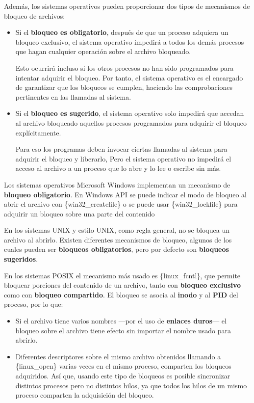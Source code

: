 Además, los sistemas operativos pueden proporcionar dos tipos de
mecanismos de bloqueo de archivos:

\begin{itemize}
\item
  Si el \textbf{bloqueo es obligatorio}{}, después de que un proceso
  adquiera un bloqueo exclusivo, el sistema operativo impedirá a todos
  los demás procesos que hagan cualquier operación sobre el archivo
  bloqueado.

  Esto ocurrirá incluso si los otros procesos no han sido programados
  para intentar adquirir el bloqueo. Por tanto, el sistema operativo es
  el encargado de garantizar que los bloqueos se cumplen, haciendo las
  comprobaciones pertinentes en las llamadas al sistema.
\item
  Si el \textbf{bloqueo es sugerido}{}, el sistema operativo solo
  impedirá que accedan al archivo bloqueado aquellos procesos
  programados para adquirir el bloqueo explícitamente.

  Para eso los programas deben invocar ciertas llamadas al sistema para
  adquirir el bloqueo y liberarlo, Pero el sistema operativo no impedirá
  el acceso al archivo a un proceso que lo abre y lo lee o escribe sin
  más.
\end{itemize}

Los sistemas operativos Microsoft Windows implementan un mecanismo de
\textbf{bloqueo obligatorio}. En Windows API se puede indicar el modo de
bloqueo al abrir el archivo con \{win32\_createfile\} o se puede usar
\{win32\_lockfile\} para adquirir un bloqueo sobre una parte del
contenido

En los sistemas UNIX y estilo UNIX, como regla general, no se bloquea un
archivo al abrirlo. Existen diferentes mecanismos de bloqueo, algunos de
los cuales pueden ser \textbf{bloqueos obligatorios}, pero por defecto
son \textbf{bloqueos sugeridos}.

En los sistemas POSIX el mecanismo más usado es \{linux\_fcntl\}, que
permite bloquear porciones del contenido de un archivo, tanto con
\textbf{bloqueo exclusivo} como con \textbf{bloqueo compartido}. El
bloqueo se asocia al \textbf{inodo} y al \textbf{PID} del proceso, por
lo que:

\begin{itemize}
\item
  Si el archivo tiene varios nombres ---por el uso de \textbf{enlaces
  duros}--- el bloqueo sobre el archivo tiene efecto sin importar el
  nombre usado para abrirlo.
\item
  Diferentes descriptores sobre el mismo archivo obtenidos llamando a
  \{linux\_open\} varias veces en el mismo proceso, comparten los
  bloqueos adquiridos. Así que, usando este tipo de bloqueos es posible
  sincronizar distintos procesos pero no distintos hilos, ya que todos
  los hilos de un mismo proceso comparten la adquisición del bloqueo.
\end{itemize}

